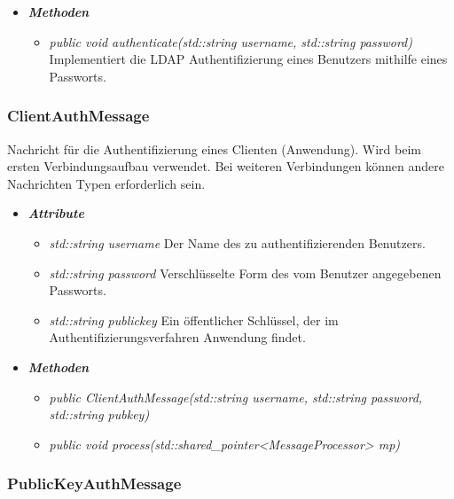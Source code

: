 \documentclass[a4paper,12pt]{article}
\begin{document}
	\begin{itemize}[label={}]

	\item\textit{\textbf{Methoden}}
		\begin{itemize}[label={\textbullet}]
			\item\textit{public void authenticate(std::string username, std::string password)} Implementiert die LDAP Authentifizierung eines Benutzers mithilfe eines Passworts.
		\end{itemize}

\end{itemize}


\subsubsection{ClientAuthMessage}

Nachricht für die Authentifizierung eines Clienten (Anwendung). Wird beim ersten Verbindungsaufbau verwendet. Bei weiteren Verbindungen können andere Nachrichten Typen erforderlich sein.

	\begin{itemize}[label={}]

	\item\textit{\textbf{Attribute}}
		\begin{itemize}[label={\textbullet}]
			\item\textit{std::string username} Der Name des zu authentifizierenden Benutzers.
			\item\textit{std::string password} Verschlüsselte Form des vom Benutzer angegebenen Passworts.
			\item\textit{std::string publickey} Ein öffentlicher Schlüssel, der im Authentifizierungsverfahren Anwendung findet.
		\end{itemize}

	\item\textit{\textbf{Methoden}}
		\begin{itemize}[label={\textbullet}]
			\item\textit{public ClientAuthMessage(std::string username, std::string password, std::string pubkey)}
			\item\textit{public void process(std::shared\_pointer<MessageProcessor> mp)}
		\end{itemize}

\end{itemize}


\subsubsection{PublicKeyAuthMessage}
\end{document}
